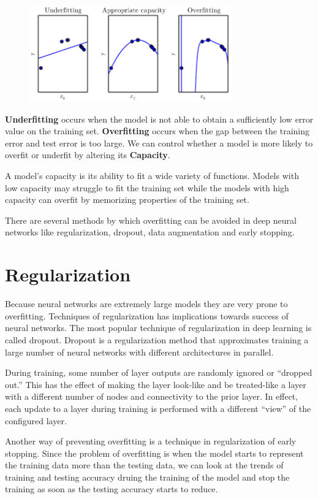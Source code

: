 \documentclass{report}
\begin{document}
\begin{figure}[ht]
	\includegraphics[width=250pt]{5}
	\centering
\end{figure}

\textbf{Underfitting} occurs when the model is not able to obtain a sufficiently low error value on the training set.  \textbf{Overfitting} occurs when the gap between the training error and test error is too large. We can control whether a model is more likely to overfit or underfit by altering its \textbf{Capacity}.

A model's capacity is its ability to fit a wide variety of functions. Models with low capacity may struggle to fit the training set while the models with high capacity can overfit by memorizing properties of the training set.

There are several methods by which overfitting can be avoided in deep neural networks like regularization, dropout, data augmentation and early stopping.

\section{Regularization}
Because neural networks are extremely large models they are very prone to overfitting. Techniques of regularization has implications towards success of neural networks. The most popular technique of regularization in deep learning is called dropout. Dropout is a regularization method that approximates training a large number of neural networks with different architectures in parallel.

During training, some number of layer outputs are randomly ignored or “dropped out.” This has the effect of making the layer look-like and be treated-like a layer with a different number of nodes and connectivity to the prior layer. In effect, each update to a layer during training is performed with a different “view” of the configured layer.


Another way of preventing overfitting is a technique in regularization of early stopping. Since the problem of overfitting is when the model starts to represent the training data more than the testing data, we can look at the trends of training and testing accuracy druing the training of the model and stop the training as soon as the testing accuracy starts to reduce.
\end{document}
